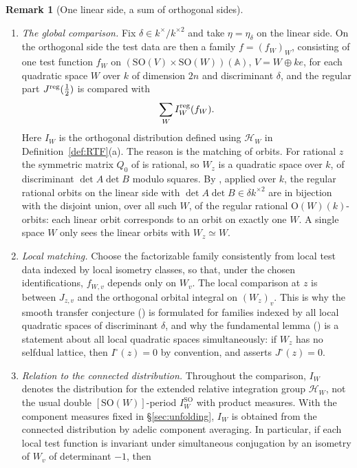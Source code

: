 \documentclass[11pt,oneside,notitlepage]{book}
\numberwithin{equation}{section}
\theoremstyle{plain}
\theoremstyle{definition}
\newtheorem{remark}[theorem]{Remark}
\newcommand{\A}{\mathbb{A}}
\newcommand{\SO}{\mathrm{SO}}
\newcommand{\Ort}{\mathrm{O}}
\begin{document}
\begin{remark}[One linear side, a sum of orthogonal sides]\label{rem:sumW}
	\begin{enumerate}[label=(\alph*)]
		\item \emph{The global comparison.} Fix $\delta\in k^\times/k^{\times2}$ and take $\eta=\eta_\delta$ on the linear side. On the orthogonal side the test data are then a family $f=(f_W)_W$, consisting of one test function $f_W$ on $(\SO(V)\times\SO(W))(\A)$, $V=W\oplus ke$, for each quadratic space $W$ over $k$ of dimension $2n$ and discriminant $\delta$, and the regular part $J^{\rm reg}(\frac12)$ is compared with
		\[\sum_WI_W^{\rm reg}(f_W).\]
		Here $I_W$ is the orthogonal distribution defined using $\mathcal H_W$ in Definition~\ref{def:RTF}(a).
		The reason is the matching of orbits. For rational $z$ the symmetric matrix $Q_0$ of  is rational, so $W_z$ is a quadratic space over $k$, of discriminant $\det A\det B$ modulo squares. By , applied over $k$, the regular rational orbits on the linear side with $\det A\det B\in\delta k^{\times2}$ are in bijection with the disjoint union, over all such $W$, of the regular rational $\Ort(W)(k)$-orbits: each linear orbit corresponds to an orbit on exactly one $W$. A single space $W$ only sees the linear orbits with $W_z\simeq W$.
		\item \emph{Local matching.} Choose the factorizable family consistently from local test data indexed by local isometry classes, so that, under the chosen identifications, $f_{W,v}$ depends only on $W_v$. The local comparison at $z$ is between $J_{z,v}$ and the orthogonal orbital integral on $(W_z)_v$. This is why the smooth transfer conjecture () is formulated for families indexed by all local quadratic spaces of discriminant $\delta$, and why the fundamental lemma () is a statement about all local quadratic spaces simultaneously: if $W_z$ has no selfdual lattice, then $I^\circ(z)=0$ by convention, and  asserts $J^\circ(z)=0$.
		\item \emph{Relation to the connected distribution.} Throughout the comparison, $I_W$ denotes the distribution for the extended relative integration group $\mathcal H_W$, not the usual double $[\SO(W)]$-period $I_W^{\SO}$ with product measures. With the component measures fixed in \S\ref{sec:unfolding}, $I_W$ is obtained from the connected distribution by adelic component averaging. In particular, if each local test function is invariant under simultaneous conjugation by an isometry of $W_v$ of determinant $-1$, then

\end{enumerate}
\end{remark}
\end{document}
